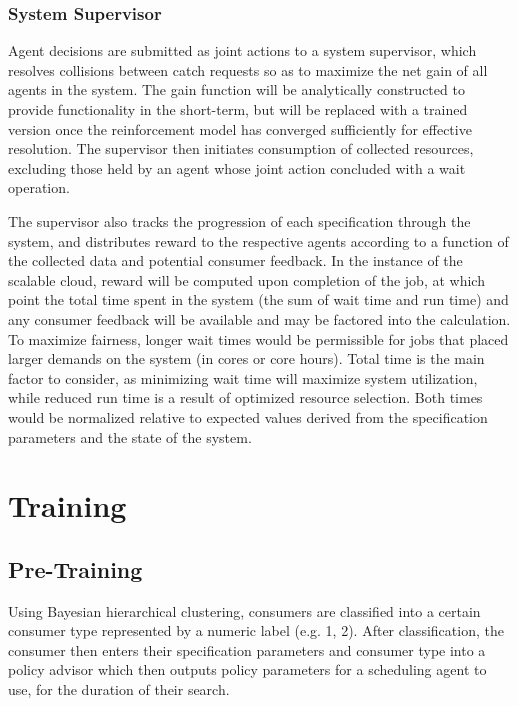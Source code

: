 \documentclass{article}
\theoremstyle{definition}
\theoremstyle{remark}
\begin{document}
		\subsubsection{System Supervisor}
		
		Agent decisions are submitted as joint actions to a system supervisor, which resolves collisions between catch requests so as to maximize the net gain of all agents in the system. The gain function will be analytically constructed to provide functionality in the short-term, but will be replaced with a trained version once the reinforcement model has converged sufficiently for effective resolution. The supervisor then initiates consumption of collected resources, excluding those held by an agent whose joint action concluded with a wait operation.
	
		The supervisor also tracks the progression of each specification through the system, and distributes reward to the respective agents according to a function of the collected data and potential consumer feedback. In the instance of the scalable cloud, reward will be computed upon completion of the job, at which point the total time spent in the system (the sum of wait time and run time) and any consumer feedback will be available and may be factored into the calculation. To maximize fairness, longer wait times would be permissible for jobs that placed larger demands on the system (in cores or core hours). Total time is the main factor to consider, as minimizing wait time will maximize system utilization, while reduced run time is a result of optimized resource selection. Both times would be normalized relative to expected values derived from the specification parameters and the state of the system.


	\section{Training}
	
		\subsection{Pre-Training}
		
		Using Bayesian hierarchical clustering, consumers are classified into a certain consumer type represented by a numeric label (e.g. 1, 2). After classification, the consumer then enters their specification parameters and consumer type into a policy advisor which then outputs policy parameters for a scheduling agent to use, for the duration of their search.
	
\end{document}
